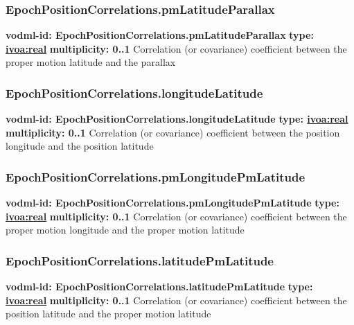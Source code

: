     \subsubsection{EpochPositionCorrelations.pmLatitudeParallax}
      \textbf{vodml-id: EpochPositionCorrelations.pmLatitudeParallax} \newline
      \textbf{type: \hyperref[sect:ivoa]{ivoa:real}} \newline
      \textbf{multiplicity: 0..1} \newline
      Correlation (or covariance) coefficient between the proper motion latitude and the parallax

    \subsubsection{EpochPositionCorrelations.longitudeLatitude}
      \textbf{vodml-id: EpochPositionCorrelations.longitudeLatitude} \newline
      \textbf{type: \hyperref[sect:ivoa]{ivoa:real}} \newline
      \textbf{multiplicity: 0..1} \newline
      Correlation (or covariance) coefficient between the position longitude and the position latitude

    \subsubsection{EpochPositionCorrelations.pmLongitudePmLatitude}
      \textbf{vodml-id: EpochPositionCorrelations.pmLongitudePmLatitude} \newline
      \textbf{type: \hyperref[sect:ivoa]{ivoa:real}} \newline
      \textbf{multiplicity: 0..1} \newline
      Correlation (or covariance) coefficient between the proper motion longitude and the proper motion latitude

    \subsubsection{EpochPositionCorrelations.latitudePmLatitude}
      \textbf{vodml-id: EpochPositionCorrelations.latitudePmLatitude} \newline
      \textbf{type: \hyperref[sect:ivoa]{ivoa:real}} \newline
      \textbf{multiplicity: 0..1} \newline
      Correlation (or covariance) coefficient between the position latitude and the proper motion latitude

